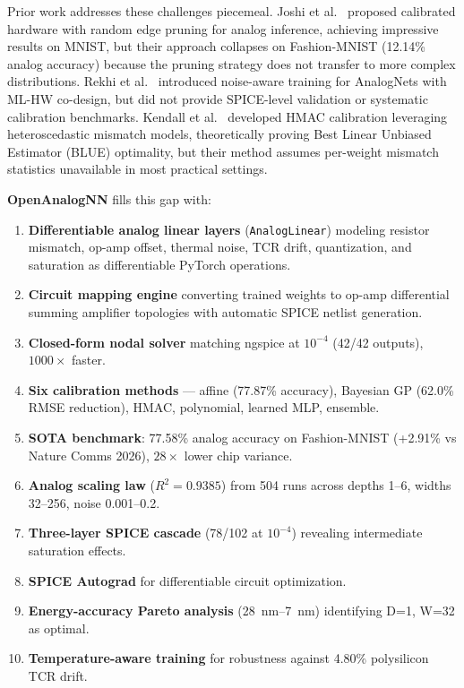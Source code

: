 \documentclass[10pt,twocolumn]{article}
\begin{document}
Prior work addresses these challenges piecemeal. Joshi et al.~\cite{joshi2026} proposed calibrated hardware with random edge pruning for analog inference, achieving impressive results on MNIST, but their approach collapses on Fashion-MNIST (12.14\% analog accuracy) because the pruning strategy does not transfer to more complex distributions. Rekhi et al.~\cite{rekhi2024} introduced noise-aware training for AnalogNets with ML-HW co-design, but did not provide SPICE-level validation or systematic calibration benchmarks. Kendall et al.~\cite{kendall2025} developed HMAC calibration leveraging heteroscedastic mismatch models, theoretically proving Best Linear Unbiased Estimator (BLUE) optimality, but their method assumes per-weight mismatch statistics unavailable in most practical settings.

\textbf{OpenAnalogNN} fills this gap with:
\begin{enumerate}
  \item \textbf{Differentiable analog linear layers} (\texttt{AnalogLinear}) modeling resistor mismatch, op-amp offset, thermal noise, TCR drift, quantization, and saturation as differentiable PyTorch operations.
  \item \textbf{Circuit mapping engine} converting trained weights to op-amp differential summing amplifier topologies with automatic SPICE netlist generation.
  \item \textbf{Closed-form nodal solver} matching ngspice at $10^{-4}$ (42/42 outputs), $1000\times$ faster.
  \item \textbf{Six calibration methods} --- affine (77.87\% accuracy), Bayesian GP (62.0\% RMSE reduction), HMAC, polynomial, learned MLP, ensemble.
  \item \textbf{SOTA benchmark}: 77.58\% analog accuracy on Fashion-MNIST (+2.91\% vs Nature Comms 2026), $28\times$ lower chip variance.
  \item \textbf{Analog scaling law} ($R^2 = 0.9385$) from 504 runs across depths 1--6, widths 32--256, noise 0.001--0.2.
  \item \textbf{Three-layer SPICE cascade} (78/102 at $10^{-4}$) revealing intermediate saturation effects.
  \item \textbf{SPICE Autograd} for differentiable circuit optimization.
  \item \textbf{Energy-accuracy Pareto analysis} (28~nm--7~nm) identifying D=1, W=32 as optimal.
  \item \textbf{Temperature-aware training} for robustness against 4.80\% polysilicon TCR drift.
\end{enumerate}
\end{document}
